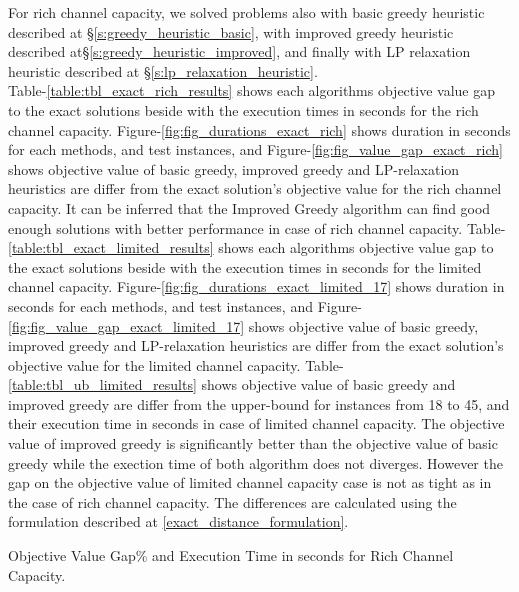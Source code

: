 \documentclass[11pt]{article}
\begin{document}
For rich channel capacity, we solved problems also with basic greedy heuristic described at \S \ref{s:greedy_heuristic_basic}, with improved greedy heuristic described at\S \ref{s:greedy_heuristic_improved}, and finally with LP relaxation heuristic described at \S \ref{s:lp_relaxation_heuristic}.\\

Table-\ref{table:tbl_exact_rich_results} shows each algorithms objective value gap to the exact solutions beside with the execution times in seconds for the rich channel capacity. Figure-\ref{fig:fig_durations_exact_rich} shows duration in seconds for each methods, and test instances, and Figure-\ref{fig:fig_value_gap_exact_rich} shows objective value of basic greedy, improved greedy and LP-relaxation heuristics are differ from the exact solution's objective value for the rich channel capacity. It can be inferred that the Improved Greedy algorithm can find good enough solutions with better performance in case of rich channel capacity. 
Table-\ref{table:tbl_exact_limited_results} shows each algorithms objective value gap to the exact solutions beside with the execution times in seconds for the limited channel capacity. Figure-\ref{fig:fig_durations_exact_limited_17} shows duration in seconds for each methods, and test instances, and Figure-\ref{fig:fig_value_gap_exact_limited_17} shows objective value of basic greedy, improved greedy and LP-relaxation heuristics are differ from the exact solution's objective value for the limited channel capacity. Table-\ref{table:tbl_ub_limited_results} shows objective value of basic greedy and improved greedy are differ from the upper-bound for instances from 18 to 45, and their execution time in seconds in case of limited channel capacity. The objective value of improved greedy is significantly better than the objective value of basic greedy while the exection time of both algorithm does not diverges. However the gap on the objective value of limited channel capacity case is not as tight as in the case of rich channel capacity.
The differences are calculated using the formulation described at \equationautorefname \eqref{exact_distance_formulation}.\\

        \begin{table}[htb!]
        \caption{Objective Value Gap\% and Execution Time in seconds for Rich Channel Capacity.}\label{table:tbl_exact_rich_results}
        \begin{adjustbox}{max width=1\textwidth}
        \end{adjustbox}
        \label{tab:test}
        \end{table}
\end{document}
